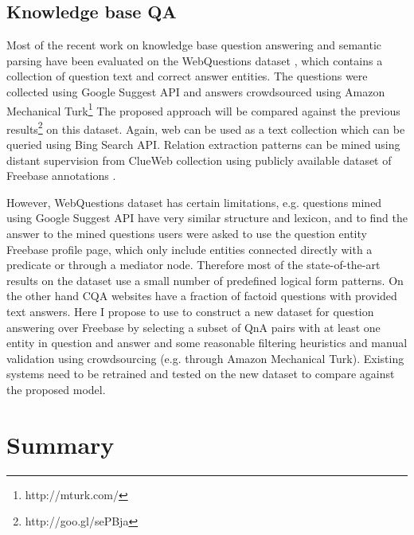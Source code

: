 \subsection{Knowledge base QA}

Most of the recent work on knowledge base question answering and semantic parsing have been evaluated on the WebQuestions dataset \cite{BerantCFL13:sempre}, which contains a collection of question text and correct answer entities.
The questions were collected using Google Suggest API and answers crowdsourced using Amazon Mechanical Turk\footnote{http://mturk.com/}
The proposed approach will be compared against the previous results\footnote{http://goo.gl/sePBja} on this dataset.
Again, web can be used as a text collection which can be queried using Bing Search API.
Relation extraction patterns can be mined using distant supervision from ClueWeb collection using publicly available dataset of Freebase annotations \cite{gabrilovich2013facc1}.

However, WebQuestions dataset has certain limitations, e.g. questions mined using Google Suggest API have very similar structure and lexicon, and to find the answer to the mined questions users were asked to use the question entity Freebase profile page,  which only include entities connected directly with a predicate or through a mediator node.
Therefore most of the state-of-the-art results on the dataset use a small number of predefined logical form patterns.
On the other hand CQA websites have a fraction of factoid questions with provided text answers.
Here I propose to use to construct a new dataset for question answering over Freebase by selecting a subset of QnA pairs with at least one entity in question and answer and some reasonable filtering heuristics and manual validation using crowdsourcing (e.g. through Amazon Mechanical Turk).
Existing systems need to be retrained and tested on the new dataset to compare against the proposed model.


\section{Summary}
